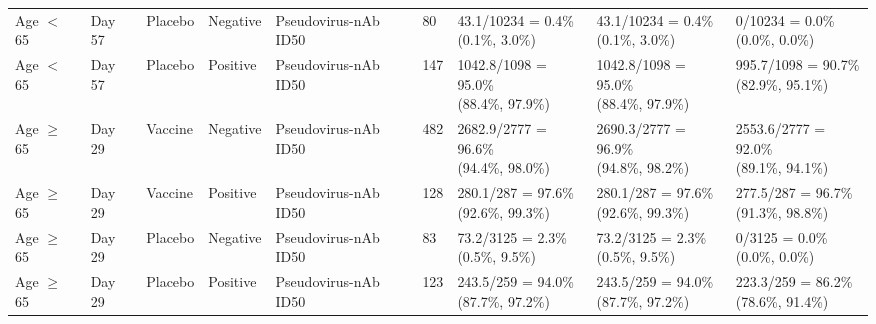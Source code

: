 \documentclass[]{book}
\theoremstyle{definition}
\theoremstyle{definition}
\theoremstyle{definition}
\newcommand{\1}{\mathbbm{1}}
\begin{document}
\begin{landscape}
\begin{ThreePartTable}
\begin{longtable}[t]{>{\raggedright\arraybackslash}p{2.7cm}llllllll}
\hspace{1em}Age $<$ 65 & Day 57 & Placebo & Negative & Pseudovirus-nAb ID50 & 80 & \makecell[l]{43.1/10234 = 0.4\%\\(0.1\%, 3.0\%)} & \makecell[l]{43.1/10234 = 0.4\%\\(0.1\%, 3.0\%)} & \makecell[l]{0/10234 = 0.0\%\\(0.0\%, 0.0\%)}\\
\hspace{1em}Age $<$ 65 & Day 57 & Placebo & Positive & Pseudovirus-nAb ID50 & 147 & \makecell[l]{1042.8/1098 = 95.0\%\\(88.4\%, 97.9\%)} & \makecell[l]{1042.8/1098 = 95.0\%\\(88.4\%, 97.9\%)} & \makecell[l]{995.7/1098 = 90.7\%\\(82.9\%, 95.1\%)}\\
\hspace{1em}Age $\geq$ 65 & Day 29 & Vaccine & Negative & Pseudovirus-nAb ID50 & 482 & \makecell[l]{2682.9/2777 = 96.6\%\\(94.4\%, 98.0\%)} & \makecell[l]{2690.3/2777 = 96.9\%\\(94.8\%, 98.2\%)} & \makecell[l]{2553.6/2777 = 92.0\%\\(89.1\%, 94.1\%)}\\
\hspace{1em}Age $\geq$ 65 & Day 29 & Vaccine & Positive & Pseudovirus-nAb ID50 & 128 & \makecell[l]{280.1/287 = 97.6\%\\(92.6\%, 99.3\%)} & \makecell[l]{280.1/287 = 97.6\%\\(92.6\%, 99.3\%)} & \makecell[l]{277.5/287 = 96.7\%\\(91.3\%, 98.8\%)}\\
\hspace{1em}Age $\geq$ 65 & Day 29 & Placebo & Negative & Pseudovirus-nAb ID50 & 83 & \makecell[l]{73.2/3125 = 2.3\%\\(0.5\%, 9.5\%)} & \makecell[l]{73.2/3125 = 2.3\%\\(0.5\%, 9.5\%)} & \makecell[l]{0/3125 = 0.0\%\\(0.0\%, 0.0\%)}\\
\hspace{1em}Age $\geq$ 65 & Day 29 & Placebo & Positive & Pseudovirus-nAb ID50 & 123 & \makecell[l]{243.5/259 = 94.0\%\\(87.7\%, 97.2\%)} & \makecell[l]{243.5/259 = 94.0\%\\(87.7\%, 97.2\%)} & \makecell[l]{223.3/259 = 86.2\%\\(78.6\%, 91.4\%)}\\

\end{longtable}
\end{ThreePartTable}
\end{landscape}
\end{document}
